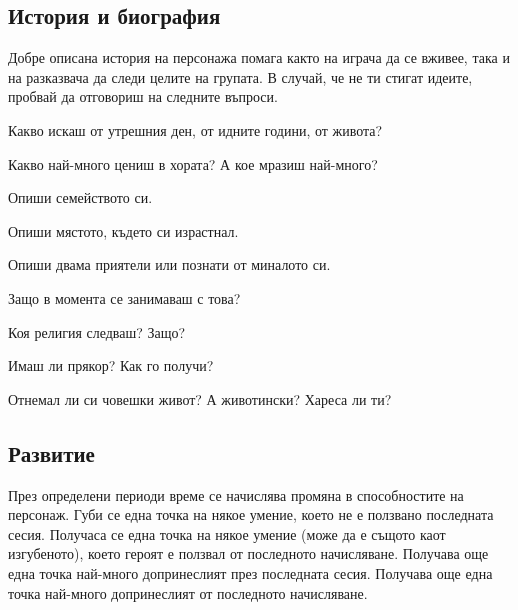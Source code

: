 \subsection{История и биография}
Добре описана история на персонажа помага както на играча да се вживее, така и на разказвача да следи целите на групата.
В случай, че не ти стигат идеите, пробвай да отговориш на следните въпроси.
\begin{itemize*}
\item{Какво искаш от утрешния ден, от идните години, от живота?}
\item{Какво най-много цениш в хората? А кое мразиш най-много?}
\item{Опиши семейството си.}
\item{Опиши мястото, където си израстнал.}
\item{Опиши двама приятели или познати от миналото си.}
\item{Защо в момента се занимаваш с това?}
\item{Коя религия следваш? Защо?}
\item{Имаш ли прякор? Как го получи?}
\item{Отнемал ли си човешки живот? А животински? Хареса ли ти?}
\end{itemize*}

\subsection{Развитие}
През определени периоди време се начислява промяна в способностите на персонаж.
Губи се една точка на някое умение, което не е ползвано последната сесия.
Получаса се една точка на някое умение (може да е същото каот изгубеното), което героят е ползвал от последното начисляване.
Получава още една точка най-много допринеслият през последната сесия.
Получава още една точка най-много допринеслият от последното начисляване.

